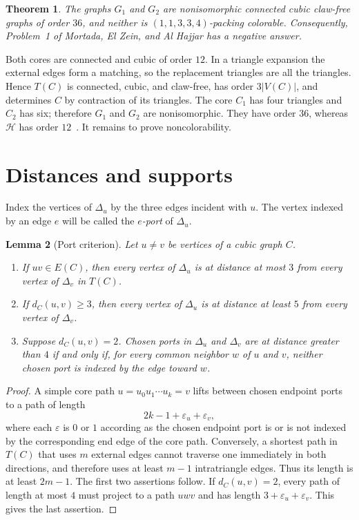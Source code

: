 \documentclass[11pt]{amsart}
\newtheorem{theorem}{Theorem}
\newtheorem{lemma}[theorem]{Lemma}
\begin{document}
\begin{theorem}\label{thm:main}
The graphs $G_1$ and $G_2$ are nonisomorphic connected cubic claw-free
graphs of order $36$, and neither is $(1,1,3,3,4)$-packing colorable.
Consequently, Problem~1 of Mortada, El Zein, and Al Hajjar has a negative
answer.
\end{theorem}

Both cores are connected and cubic of order $12$. In a triangle expansion
the external edges form a matching, so the replacement triangles are all
the triangles. Hence $T(C)$ is connected, cubic, and claw-free, has order
$3|V(C)|$, and determines $C$ by contraction of its triangles. The core
$C_1$ has four triangles and $C_2$ has six; therefore $G_1$ and $G_2$ are
nonisomorphic. They have order $36$, whereas $\mathcal H$ has order
$12$~\cite[Figure~1]{MEH}. It remains to prove noncolorability.

\section{Distances and supports}

Index the vertices of $\Delta_u$ by the three edges incident with $u$.
The vertex indexed by an edge $e$ will be called the \emph{$e$-port} of
$\Delta_u$.

\begin{lemma}[Port criterion]\label{lem:ports}
Let $u\ne v$ be vertices of a cubic graph $C$.
\begin{enumerate}
\item If $uv\in E(C)$, then every vertex of $\Delta_u$ is at distance at
most $3$ from every vertex of $\Delta_v$ in $T(C)$.
\item If $d_C(u,v)\ge3$, then every vertex of $\Delta_u$ is at distance
at least $5$ from every vertex of $\Delta_v$.
\item Suppose $d_C(u,v)=2$. Chosen ports in $\Delta_u$ and $\Delta_v$
are at distance greater than $4$ if and only if, for every common neighbor
$w$ of $u$ and $v$, neither chosen port is indexed by the edge toward $w$.
\end{enumerate}
\end{lemma}

\begin{proof}
A simple core path $u=u_0u_1\cdots u_k=v$ lifts between chosen endpoint
ports to a path of length
\[
 2k-1+\varepsilon_u+\varepsilon_v,
\]
where each $\varepsilon$ is $0$ or $1$ according as the chosen endpoint
port is or is not indexed by the corresponding end edge of the core path.
Conversely, a shortest path in $T(C)$ that uses $m$ external edges cannot
traverse one immediately in both directions, and therefore uses at least
$m-1$ intratriangle edges. Thus its length is at least $2m-1$. The first
two assertions follow. If $d_C(u,v)=2$, every path of length at most $4$
must project to a path $uwv$ and has length
$3+\varepsilon_u+\varepsilon_v$. This gives the last assertion.
\end{proof}
\end{document}
